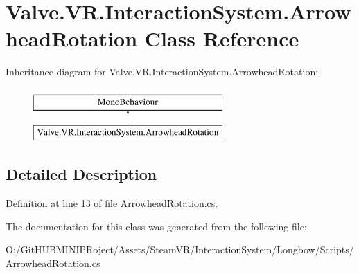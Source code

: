 \hypertarget{class_valve_1_1_v_r_1_1_interaction_system_1_1_arrowhead_rotation}{}\section{Valve.\+V\+R.\+Interaction\+System.\+Arrowhead\+Rotation Class Reference}
\label{class_valve_1_1_v_r_1_1_interaction_system_1_1_arrowhead_rotation}
Inheritance diagram for Valve.\+V\+R.\+Interaction\+System.\+Arrowhead\+Rotation\+:\begin{figure}[H]
\begin{center}
\leavevmode
\includegraphics[height=2.000000cm]{class_valve_1_1_v_r_1_1_interaction_system_1_1_arrowhead_rotation}
\end{center}
\end{figure}


\subsection{Detailed Description}


Definition at line 13 of file Arrowhead\+Rotation.\+cs.



The documentation for this class was generated from the following file\+:\begin{DoxyCompactItemize}
\item 
O\+:/\+Git\+H\+U\+B\+M\+I\+N\+I\+P\+Roject/\+Assets/\+Steam\+V\+R/\+Interaction\+System/\+Longbow/\+Scripts/\mbox{\hyperlink{_arrowhead_rotation_8cs}{Arrowhead\+Rotation.\+cs}}\end{DoxyCompactItemize}
